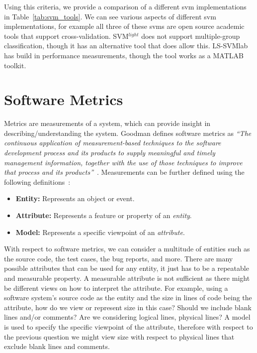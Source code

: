 Using this criteria, we provide a comparison of a different \gls{svm} implementations in Table~\ref{tab:svm_tools}. We can see various aspects of different \gls{svm} implementations, for example all three of these \gls{svm}s are open source academic tools that support cross-validation. SVM$^{light}$ does not support multiple-group classification, though it has an alternative tool that does allow this. LS-SVMlab has build in performance measurements, though the tool works as a MATLAB toolkit.


\section{Software Metrics}
\label{sec:background_metrics}
Metrics are measurements of a system, which can provide insight in describing/understanding the system. Goodman defines software metrics as \emph{``The continuous application of measurement-based techniques to the software development process and its products to supply meaningful and timely management information, together with the use of those techniques to improve that process and its products''}~\cite{Goo93}. Measurements can be further defined using the following definitions~\cite{Fen94}:

\begin{itemize}
  \item \textbf{Entity:} Represents an object or event.
  \item \textbf{Attribute:} Represents a feature or property of an \emph{entity}.
  \item \textbf{Model:} Represents a specific viewpoint of an \emph{attribute}.
\end{itemize}

With respect to software metrics, we can consider a multitude of entities such as the source code, the test cases, the bug reports, and more. There are many possible attributes that can be used for any entity, it just has to be a repeatable and measurable property. A measurable attribute is not sufficient as there might be different views on how to interpret the attribute. For example, using a software system's source code as the entity and the size in lines of code being the attribute, how do we view or represent size in this case? Should we include blank lines and/or comments? Are we considering logical lines, physical lines? A model is used to specify the specific viewpoint of the attribute, therefore with respect to the previous question we might view size with respect to physical lines that exclude blank lines and comments.

